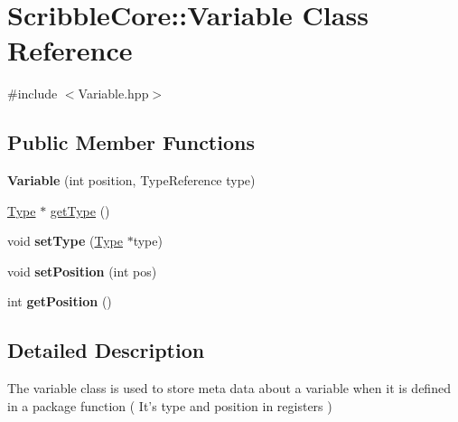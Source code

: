 \hypertarget{class_scribble_core_1_1_variable}{\section{Scribble\-Core\-:\-:Variable Class Reference}
\label{class_scribble_core_1_1_variable}
}


{\ttfamily \#include $<$Variable.\-hpp$>$}

\subsection*{Public Member Functions}
\begin{DoxyCompactItemize}
\item 
\hypertarget{class_scribble_core_1_1_variable_a9724b5d36cf8944a51ede6dfeee0dd66}{{\bfseries Variable} (int position, Type\-Reference type)}\label{class_scribble_core_1_1_variable_a9724b5d36cf8944a51ede6dfeee0dd66}

\item 
\hyperlink{class_scribble_core_1_1_type}{Type} $\ast$ \hyperlink{class_scribble_core_1_1_variable_a4d57a13af1d015cba3ef0e28d828db29}{get\-Type} ()
\item 
\hypertarget{class_scribble_core_1_1_variable_a29f45e177ad71942908e691b3fe0fa1f}{void {\bfseries set\-Type} (\hyperlink{class_scribble_core_1_1_type}{Type} $\ast$type)}\label{class_scribble_core_1_1_variable_a29f45e177ad71942908e691b3fe0fa1f}

\item 
\hypertarget{class_scribble_core_1_1_variable_a68827f8ea0b4d415ca6b149de66556a2}{void {\bfseries set\-Position} (int pos)}\label{class_scribble_core_1_1_variable_a68827f8ea0b4d415ca6b149de66556a2}

\item 
\hypertarget{class_scribble_core_1_1_variable_a75795407003815016a7ac4680247d9c2}{int {\bfseries get\-Position} ()}\label{class_scribble_core_1_1_variable_a75795407003815016a7ac4680247d9c2}

\end{DoxyCompactItemize}


\subsection{Detailed Description}
The variable class is used to store meta data about a variable when it is defined in a package function ( It's type and position in registers ) 

